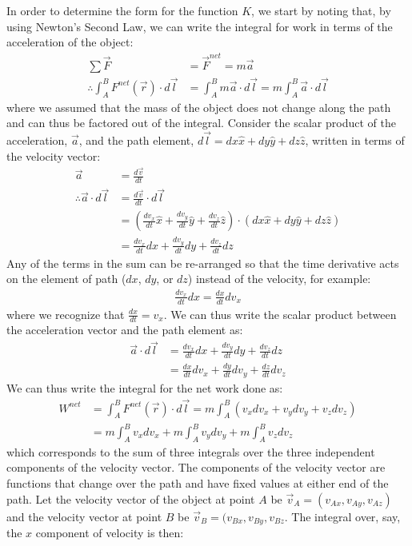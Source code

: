 In order to determine the form for the function $K$, we start by noting that, by using Newton's Second Law, we can write the integral for work in terms of the acceleration of the object:
\begin{align*}
\sum \vec F &= \vec F^{net} = m\vec a\\
\therefore \int_A^B F^{net}(\vec r) \cdot d\vec l &= \int_A^B m\vec a\cdot d\vec l =m\int_A^B \vec a\cdot d\vec l
\end{align*}
where we assumed that the mass of the object does not change along the path and can thus be factored out of the integral. Consider the scalar product of the acceleration, $\vec a$, and the path element, $d\vec l=dx\hat x  +dy\hat y + dz\hat z$, written in terms of the velocity vector:
\begin{align*}
\vec a & = \frac{d\vec v}{dt}\\
\therefore \vec a\cdot d\vec l &= \frac{d\vec v}{dt}\cdot d\vec l\\
&=\left(\frac{dv_x}{dt}\hat x+ \frac{dv_y}{dt}\hat y + \frac{dv_z}{dt}\hat z\right) \cdot (dx\hat x  +dy\hat y + dz\hat z)\\
&=\frac{dv_x}{dt}dx+\frac{dv_y}{dt}dy+\frac{dv_z}{dt}dz
\end{align*}
Any of the terms in the sum can be re-arranged so that the time derivative acts on the element of path ($dx$, $dy$, or $dz$) instead of the velocity, for example:
\begin{align*}
\frac{dv_x}{dt}dx = \frac{dx}{dt}dv_x
\end{align*}
where we recognize that $\frac{dx}{dt} = v_x$. We can thus write the scalar product between the acceleration vector and the path element as:
\begin{align*}
\vec a\cdot d\vec l&= \frac{dv_x}{dt}dx+\frac{dv_y}{dt}dy+\frac{dv_z}{dt}dz\\
&=\frac{dx}{dt}dv_x + \frac{dy}{dt}dv_y+\frac{dz}{dt}dv_z
\end{align*}
We can thus write the integral for the net work done as:
\begin{align*}
W^{net} &= \int_A^B F^{net}(\vec r) \cdot d\vec l =m \int_A^B (v_xdv_x + v_ydv_y + v_zdv_z)\\
&=m\int_A^B v_xdv_x +m\int_A^B  v_ydv_y + m\int_A^B v_zdv_z
\end{align*}
which corresponds to the sum of three integrals over the three independent components of the velocity vector. The components of the velocity vector are functions that change over the path and have fixed values at either end of the path. Let the velocity vector of the object at point $A$ be $\vec v_A=(v_{Ax}, v_{Ay}, v_{Az})$ and the velocity vector at point $B$ be $\vec v_B=(v_{Bx}, v_{By}, v_{Bz}$. The integral over, say, the $x$ component of velocity is then:
